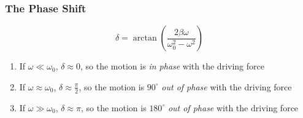 \documentclass[a4paper]{article}
\begin{document}
\subsubsection{The Phase Shift}
\[ \delta = \arctan\left(\frac{2\beta\omega}{\omega_0^2-\omega^2}\right) \]
\begin{enumerate}
	\item If $\omega \ll \omega_0$, $\delta \approx 0$, so the motion is
		\emph{in phase} with the driving force
	\item If $\omega \approx \omega_0$, $\delta \approx \frac{\pi}{2}$, so
		the motion is $90^\circ$ \emph{out of phase} with the
		driving force
	\item If $\omega \gg \omega_0$, $\delta \approx \pi$, so the motion is
		$180^\circ$ \emph{out of phase} with the driving force
\end{enumerate}
\end{document}
